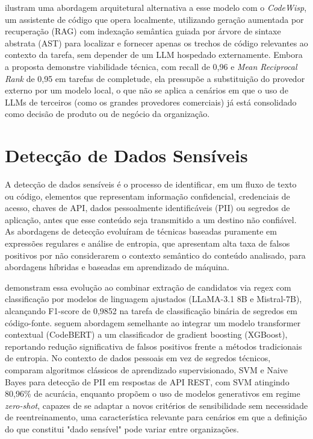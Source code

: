  ilustram uma abordagem arquitetural alternativa a esse modelo com o \textit{CodeWisp}, um assistente de código que opera localmente, utilizando geração aumentada por recuperação (RAG) com indexação semântica guiada por árvore de sintaxe abstrata (AST) para localizar e fornecer apenas os trechos de código relevantes ao contexto da tarefa, sem depender de um LLM hospedado externamente. Embora a proposta demonstre viabilidade técnica, com recall de 0,96 e \textit{Mean Reciprocal Rank} de 0,95 em tarefas de completude, ela pressupõe a substituição do provedor externo por um modelo local, o que não se aplica a cenários em que o uso de LLMs de terceiros (como os grandes provedores comerciais) já está consolidado como decisão de produto ou de negócio da organização.

\section{Detecção de Dados Sensíveis}

A detecção de dados sensíveis é o processo de identificar, em um fluxo de texto ou código, elementos que representam informação confidencial, credenciais de acesso, chaves de API, dados pessoalmente identificáveis (PII) ou segredos de aplicação, antes que esse conteúdo seja transmitido a um destino não confiável. As abordagens de detecção evoluíram de técnicas baseadas puramente em expressões regulares e análise de entropia, que apresentam alta taxa de falsos positivos por não considerarem o contexto semântico do conteúdo analisado, para abordagens híbridas e baseadas em aprendizado de máquina.

 demonstram essa evolução ao combinar extração de candidatos via regex com classificação por modelos de linguagem ajustados (LLaMA-3.1 8B e Mistral-7B), alcançando F1-score de 0,9852 na tarefa de classificação binária de segredos em código-fonte.  seguem abordagem semelhante ao integrar um modelo transformer contextual (CodeBERT) a um classificador de gradient boosting (XGBoost), reportando redução significativa de falsos positivos frente a métodos tradicionais de entropia. No contexto de dados pessoais em vez de segredos técnicos,  comparam algoritmos clássicos de aprendizado supervisionado, SVM e Naive Bayes para detecção de PII em respostas de API REST, com SVM atingindo 80,96\% de acurácia, enquanto  propõem o uso de modelos generativos em regime \textit{zero-shot}, capazes de se adaptar a novos critérios de sensibilidade sem necessidade de reentreinamento, uma característica relevante para cenários em que a definição do que constitui "dado sensível" pode variar entre organizações.

